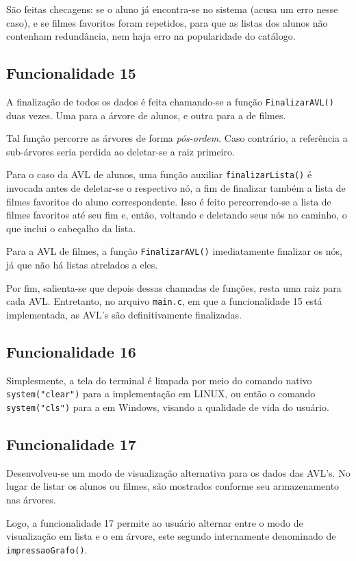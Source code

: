 \documentclass[12pt,a4paper,portuguese]{article}
\begin{document}
        São feitas checagens: se o aluno já encontra-se no sistema (acusa um erro nesse caso), e se filmes favoritos foram repetidos, para que as listas dos alunos não contenham redundância, nem haja erro na popularidade do catálogo.

    \subsection*{Funcionalidade 15}
        A finalização de todos os dados é feita chamando-se a função \verb|FinalizarAVL()| duas vezes. Uma para a árvore de alunos, e outra para a de filmes.

        Tal função percorre as árvores de forma \textit{pós-ordem}. Caso contrário, a referência a sub-árvores seria perdida ao deletar-se a raiz primeiro.

        Para o caso da AVL de alunos, uma função auxiliar \verb|finalizarLista()| é invocada antes de deletar-se o respectivo nó, a fim de finalizar também a lista de filmes favoritos do aluno correspondente. Isso é feito percorrendo-se a lista de filmes favoritos até seu fim e, então, voltando e deletando seus nós no caminho, o que inclui o cabeçalho da lista.

        Para a AVL de filmes, a função \verb|FinalizarAVL()| imediatamente finalizar os nós, já que não há listas atrelados a eles.

        Por fim, salienta-se que depois dessas chamadas de funções, resta uma raiz para cada AVL. Entretanto, no arquivo \verb|main.c|, em que a funcionalidade 15 está implementada, as AVL's são definitivamente finalizadas.

    \subsection*{Funcionalidade 16}
        Simplesmente, a tela do terminal é limpada por meio do comando nativo \verb|system("clear")| para a implementação em LINUX, ou então o comando \verb|system("cls")| para a em Windows, visando a qualidade de vida do usuário.

    \subsection*{Funcionalidade 17}
        Desenvolveu-se um modo de visualização alternativa para os dados das AVL's. No lugar de listar os alunos ou filmes, são mostrados conforme seu armazenamento nas árvores.

        Logo, a funcionalidade 17 permite ao usuário alternar entre o modo de visualização em lista e o em árvore, este segundo internamente denominado de \verb|impressaoGrafo()|.
\end{document}
